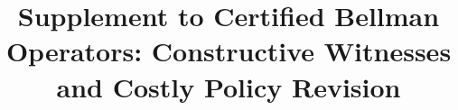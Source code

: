 
\usepackage{xr}

\begin{frontmatter}
\title{Supplement to Certified Bellman Operators: Constructive Witnesses and Costly Policy Revision}
\begin{aug}\author[id=au1,addressref={add1}]{~}\address[id=add1]{}\end{aug}
\end{frontmatter}


